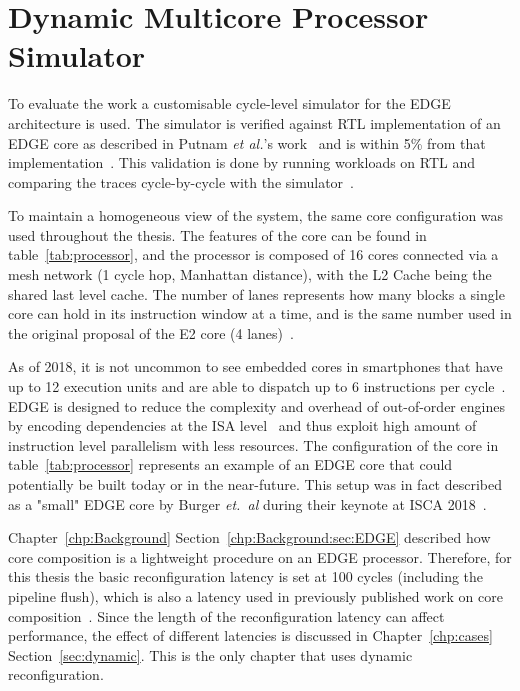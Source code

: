 \section{Dynamic Multicore Processor Simulator}\label{chp:setup:conf}

To evaluate the work a customisable cycle-level simulator for the EDGE architecture is used.
The simulator is verified against RTL implementation of an EDGE core as described in Putnam {\it et al.}'s work~\cite{putnam2010e2} and is within 5\% from that implementation~\cite{micolet2016dmpstream}.
This validation is done by running workloads on RTL and comparing the traces cycle-by-cycle with the simulator~\cite{micolet2017cases}.

To maintain a homogeneous view of the system, the same core configuration was used throughout the thesis.
The features of the core can be found in table~\ref{tab:processor}, and the processor is composed of 16 cores connected via a mesh network (1 cycle hop, Manhattan distance), with the L2 Cache being the shared last level cache.
The number of lanes represents how many blocks a single core can hold in its instruction window at a time, and is the same number used in the original proposal of the E2 core (4 lanes)~\cite{putnam2010e2}.

As of 2018, it is not uncommon to see embedded cores in smartphones that have up to 12 execution units and are able to dispatch up to 6 instructions per cycle~\cite{samsung2018,apple}.
EDGE is designed to reduce the complexity and overhead of out-of-order engines by encoding dependencies at the ISA level~\cite{kim2007tflex,gray2018edge} and thus exploit high amount of instruction level parallelism with less resources.
The configuration of the core in table~\ref{tab:processor} represents an example of an EDGE core that could potentially be built today or in the near-future.
This setup was in fact described as a "small" EDGE core by Burger {\it et.~al} during their keynote at ISCA 2018~\cite{iscakeynote,e2thereg,twitter}.

Chapter~\ref{chp:Background} Section~\ref{chp:Background:sec:EDGE} described how core composition is a lightweight procedure on an EDGE processor.
Therefore, for this thesis the basic reconfiguration latency is set at 100 cycles (including the pipeline flush), which is also a latency used in previously published work on core composition~\cite{pricopi2012bahurupi}.
Since the length of the reconfiguration latency can affect performance, the effect of different latencies is discussed in Chapter~\ref{chp:cases} Section~\ref{sec:dynamic}.
This is the only chapter that uses dynamic reconfiguration.
 
